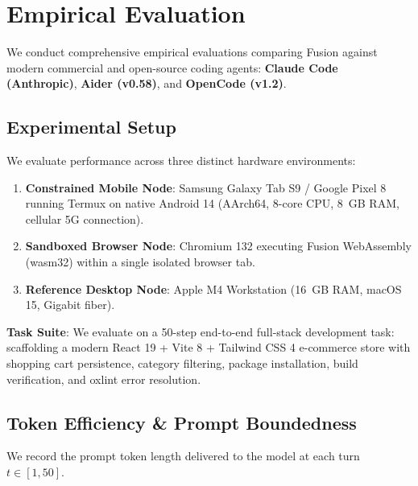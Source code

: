 \section{Empirical Evaluation}
\label{sec:eval}

We conduct comprehensive empirical evaluations comparing Fusion against modern commercial and open-source coding agents: \textbf{Claude Code (Anthropic)}, \textbf{Aider (v0.58)}, and \textbf{OpenCode (v1.2)}.

\subsection{Experimental Setup}
We evaluate performance across three distinct hardware environments:
\begin{enumerate}
    \item \textbf{Constrained Mobile Node}: Samsung Galaxy Tab S9 / Google Pixel 8 running Termux on native Android 14 (AArch64, 8-core CPU, 8~GB RAM, cellular 5G connection).
    \item \textbf{Sandboxed Browser Node}: Chromium 132 executing Fusion WebAssembly (wasm32) within a single isolated browser tab.
    \item \textbf{Reference Desktop Node}: Apple M4 Workstation (16~GB RAM, macOS 15, Gigabit fiber).
\end{enumerate}

\noindent\textbf{Task Suite}: We evaluate on a 50-step end-to-end full-stack development task: scaffolding a modern React 19 + Vite 8 + Tailwind CSS 4 e-commerce store with shopping cart persistence, category filtering, package installation, build verification, and oxlint error resolution.

\subsection{Token Efficiency \& Prompt Boundedness}
We record the prompt token length delivered to the model at each turn $t \in [1, 50]$.

